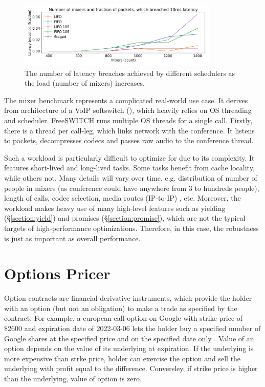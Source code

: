 \documentclass[12pt,a4paper,twoside]{report}
\begin{document}
\begin{figure} 
    \centering 
    \includegraphics[width=0.85\textwidth]{eval/mixer-base8.png}
    \caption{The number of latency breaches achieved by different schedulers as the load (number of mixers) increases.}
   \label{fig:mixer-bench}
\end{figure}

The mixer benchmark represents a complicated real-world use case. It derives from architecture of a VoIP softswitch (\cite{Maruzzelli2017-ou}), which heavily relies on OS threading and scheduler. FreeSWITCH runs multiple OS threads for a single call. Firstly, there is a thread per call-leg, which links network with the conference. It listens to packets, decompresses codecs and passes raw audio to the conference thread.  


Such a workload is particularly difficult to optimize for due to its complexity. It features short-lived and long-lived tasks. Some tasks benefit from cache locality, while others not. Many details will vary over time, e.g. distribution of number of people in mixers (as conference could have anywhere from 3 to hundreds people), length of calls, codec selection, media routes (IP-to-IP) \cite{Frequent1:online}, etc. Moreover, the workload makes heavy use of many high-level features such as yielding (\S\ref{section:yield}) and promises (\S\ref{section:promise}), which are not the typical targets of high-performance optimizations. Therefore, in this case, the robustness is just as important as overall performance. 


\label{paragraph:overflow-queue-bad-2}

\section{Options Pricer}
Option contracts are financial derivative instruments, which provide the holder with an option (but not an obligation) to make a trade as specified by the contract. For example, a european call option on Google with strike price of \$2600 and expiration date of 2022-03-06 lets the holder buy a specified number of Google shares at the specified price and on the specified date only \cite{Hull_John}. Value of an option depends on the value of its underlying at expiration. If the underlying is more expensive than strke price, holder can exercise the option and sell the underlying with profit equal to the difference. Conversley, if strike price is higher than the underlying, value of option is zero.  
\end{document}
